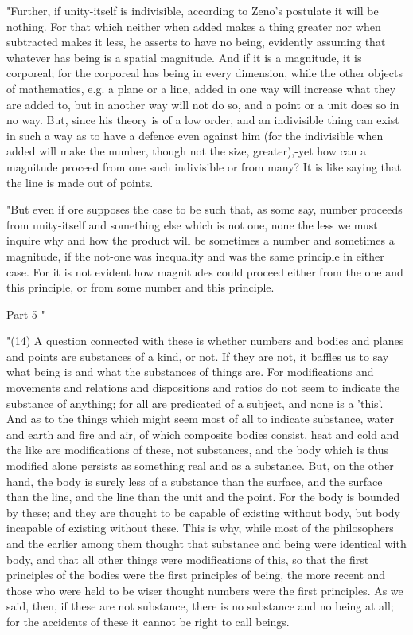 "Further, if unity-itself is indivisible, according to Zeno's postulate
it will be nothing. For that which neither when added makes a thing
greater nor when subtracted makes it less, he asserts to have no being,
evidently assuming that whatever has being is a spatial magnitude.
And if it is a magnitude, it is corporeal; for the corporeal has being
in every dimension, while the other objects of mathematics, e.g. a
plane or a line, added in one way will increase what they are added
to, but in another way will not do so, and a point or a unit does
so in no way. But, since his theory is of a low order, and an indivisible
thing can exist in such a way as to have a defence even against him
(for the indivisible when added will make the number, though not the
size, greater),-yet how can a magnitude proceed from one such indivisible
or from many? It is like saying that the line is made out of points.

"But even if ore supposes the case to be such that, as some say, number
proceeds from unity-itself and something else which is not one, none
the less we must inquire why and how the product will be sometimes
a number and sometimes a magnitude, if the not-one was inequality
and was the same principle in either case. For it is not evident how
magnitudes could proceed either from the one and this principle, or
from some number and this principle. 

Part 5 "

"(14) A question connected with these is whether numbers and bodies
and planes and points are substances of a kind, or not. If they are
not, it baffles us to say what being is and what the substances of
things are. For modifications and movements and relations and dispositions
and ratios do not seem to indicate the substance of anything; for
all are predicated of a subject, and none is a 'this'. And as to the
things which might seem most of all to indicate substance, water and
earth and fire and air, of which composite bodies consist, heat and
cold and the like are modifications of these, not substances, and
the body which is thus modified alone persists as something real and
as a substance. But, on the other hand, the body is surely less of
a substance than the surface, and the surface than the line, and the
line than the unit and the point. For the body is bounded by these;
and they are thought to be capable of existing without body, but body
incapable of existing without these. This is why, while most of the
philosophers and the earlier among them thought that substance and
being were identical with body, and that all other things were modifications
of this, so that the first principles of the bodies were the first
principles of being, the more recent and those who were held to be
wiser thought numbers were the first principles. As we said, then,
if these are not substance, there is no substance and no being at
all; for the accidents of these it cannot be right to call beings.

